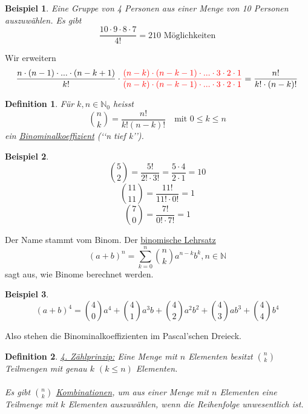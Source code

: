 \documentclass{report}
\newtheorem{mydef}{Definition}
\newtheorem{myexample}{Beispiel}
\begin{document}
\begin{myexample}
Eine Gruppe von 4 Personen aus einer Menge von 10 Personen auszuwählen. Es gibt
\begin{equation}
\frac{10 \cdot 9 \cdot 8 \cdot 7}{4!} = 210 \mbox{ Möglichkeiten}
\end{equation}
\end{myexample}
Wir erweitern
\begin{equation}
\frac{n \cdot (n-1) \cdot ... \cdot (n-k+1)}{k!} \cdot \textcolor{red}{\frac{(n-k) \cdot (n-k-1) \cdot ... \cdot 3 \cdot 2 \cdot 1}{(n-k) \cdot (n-k-1) \cdot ... \cdot 3 \cdot 2 \cdot 1}} = \frac{n!}{k! \cdot (n-k)!}
\end{equation}
\begin{mydef}
Für $k, n \in \mathbb{N}_{0}$ heisst
\begin{equation}
\binom{n}{k} = \frac{n!}{k!(n-k)!} \quad \mbox{mit } 0 \leq k \leq n
\end{equation}
ein \underline{Binominalkoeffizient} (\lq\lq{}n tief k\rq\rq{}).
\end{mydef}
\begin{myexample}
\begin{equation}
\binom{5}{2} = \frac{5!}{2! \cdot 3!} = \frac{5 \cdot 4}{2 \cdot 1} = 10
\end{equation}
\begin{equation}
\binom{11}{11} = \frac{11!}{11! \cdot 0!} = 1
\end{equation}
\begin{equation}
\binom{7}{0} = \frac{7!}{0! \cdot 7!} = 1
\end{equation}
\end{myexample}
Der Name stammt vom Binom. Der \underline{binomische Lehrsatz}
\begin{equation}
(a + b)^n = \sum^n_{k=0}{\binom{n}{k} a^{n-k} b^k}, n \in \mathbb{N}
\end{equation}
sagt aus, wie Binome berechnet werden.
\begin{myexample}
\begin{equation}
(a+b)^4 = \binom{4}{0} a^4 + \binom{4}{1} a^3b + \binom{4}{2} a^2b^2 + \binom{4}{3} ab^3 + \binom{4}{4} b^4
\end{equation}
\end{myexample}
Also stehen die Binominalkoeffizienten im Pascal\rq{}schen Dreieck.
\begin{mydef}
\underline{4. Zählprinzip:} Eine Menge mit $n$ Elementen besitzt $\binom{n}{k}$ Teilmengen mit genau $k$ $(k \leq n)$ Elementen.\\\\
Es gibt $\binom{n}{k}$ \underline{Kombinationen}, um aus einer Menge mit $n$ Elementen eine Teilmenge mit $k$ Elementen auszuwählen, wenn die Reihenfolge unwesentlich ist.
\end{mydef}
\end{document}
